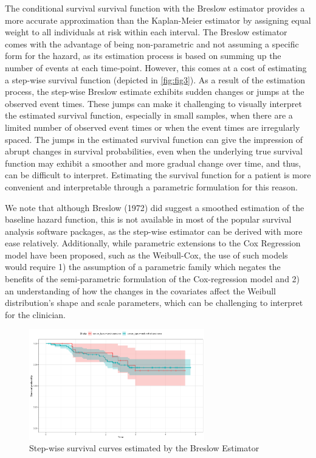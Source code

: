 The conditional survival survival function with the Breslow estimator provides a more accurate approximation than the Kaplan-Meier estimator by assigning equal weight to all individuals at risk within each interval. The Breslow estimator comes with the advantage of being non-parametric and not assuming a specific form for the hazard, as its estimation process is based on summing up the number of events at each time-point. However, this comes at a cost of estimating a step-wise survival function (depicted in \autoref{fig:fig3}). As a result of the estimation process, the step-wise Breslow estimate exhibits sudden changes or jumps at the observed event times. These jumps can make it challenging to visually interpret the estimated survival function, especially in small samples, when there are a limited number of observed event times or when the event times are irregularly spaced. The jumps in the estimated survival function can give the impression of abrupt changes in survival probabilities, even when the underlying true survival function may exhibit a smoother and more gradual change over time, and thus, can be difficult to interpret. Estimating the survival function for a patient is more convenient and interpretable through a parametric formulation for this reason. 

We note that although Breslow (1972) did suggest a smoothed estimation of the baseline hazard function, this is not available in most of the popular survival analysis software packages, as the step-wise estimator can be derived with more ease relatively. Additionally, while parametric extensions to the Cox Regression model have been proposed, such as the Weibull-Cox, the use of such models would require 1) the assumption of a parametric family which negates the benefits of the semi-parametric formulation of the Cox-regression model and 2) an understanding of how the changes in the covariates affect the Weibull distribution's shape and scale parameters, which can be challenging to interpret for the clinician. 

\begin{figure}[h]
    \centering
    \includegraphics[width=3in]{cancertype.png}
    \caption{Step-wise survival curves estimated by the Breslow Estimator}
    \label{fig:fig3}   %
    \end{figure}


